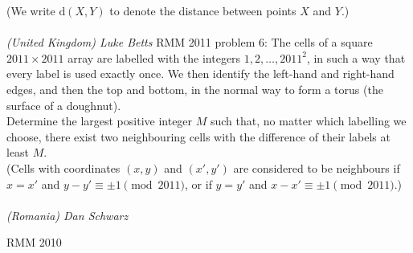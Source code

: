 (We write $\textrm{d}(X,Y)$ to denote the distance between points $X$ and $Y$.) \\\\
\textit{(United Kingdom) Luke Betts} 
RMM 2011 problem 6:  The cells of a square $2011 \times 2011$ array are labelled with the integers $1,2,\ldots, 2011^2$, in such a way that every label is used exactly once. We then identify the left-hand and right-hand edges, and then the top and bottom, in the normal way to form a torus (the surface of a doughnut). \\
Determine the largest positive integer $M$ such that, no matter which labelling we choose, there exist two neighbouring cells with the difference of their labels at least $M$. \\
(Cells with coordinates $(x,y)$ and $(x',y')$ are considered to be neighbours if $x=x'$ and $y-y'\equiv\pm1\pmod{2011}$, or if $y=y'$ and $x-x'\equiv\pm1\pmod{2011}$.) \\\\
\textit{(Romania) Dan Schwarz} 

RMM 2010 

